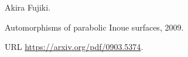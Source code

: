 Akira Fujiki.

\newblock Automorphisms of parabolic {Inoue} surfaces, 2009.

\newblock URL \url{https://arxiv.org/pdf/0903.5374}.

